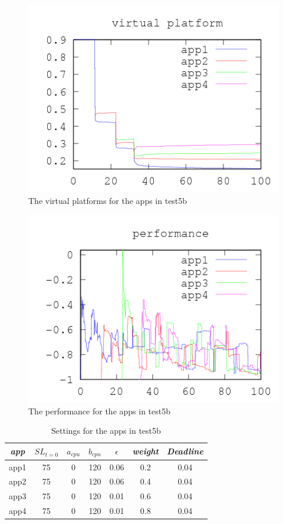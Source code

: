 \documentclass[nobiblatex]{LTHthesis}
\begin{document}
\begin{figure}[!H]
  \centering
  \includegraphics{"tools/plot/logs/test5b/vp"}
  \caption{The virtual platforms for the apps in test5b}
  \label{fig:test5b_vp}
\end{figure}

\begin{figure}[!H]
  \centering
  \includegraphics{"tools/plot/logs/test5b/f"}
  \caption{The performance for the apps in test5b}
  \label{fig:test5b_f}
\end{figure}



\begin{table}
  \centering
  \begin{tabular}{|c|c|c|c|c|c|c|}
 	\hline 
   \emph{app} & $SL_{t=0}$ & \textbf{$a_{cpu}$} & \textbf{$b_{cpu}$} & \textbf{$\epsilon$} & \emph{weight} & \emph{Deadline} \\ \hline
	app1 & 75 & 0 & 120 & 0.06 & 0.2 &0.04  \\ \hline
	app2 & 75 & 0 & 120 & 0.06 & 0.4 &0.04  \\ \hline
	app3 & 75 & 0 & 120 & 0.01 & 0.6 &0.04  \\ \hline
	app4 & 75 & 0 & 120 & 0.01 & 0.8 &0.04  \\ \hline        
  \end{tabular}
  \caption{Settings for the apps in test5b}
  \label{tab:settings_test5b}
\end{table}
\end{document}
